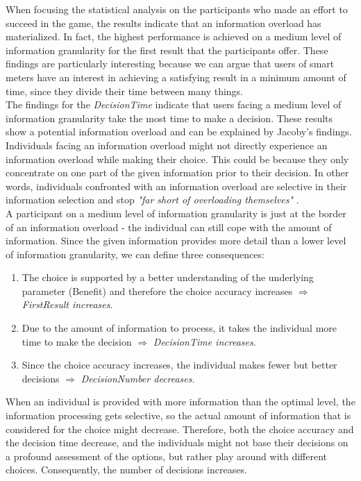 When focusing the statistical analysis on the participants who made an effort to succeed in the game, the results indicate that an information overload has materialized. In fact, the highest performance is achieved on a medium level of information granularity for the first result that the participants offer. These findings are particularly interesting because we can argue that users of smart meters have an interest in achieving a satisfying result in a minimum amount of time, since they divide their time between many things.\\
The findings for the \textit{DecisionTime} indicate that users facing a medium level of information granularity take the most time to make a decision. These results show a potential information overload and can be explained by Jacoby's findings.\\ 
Individuals facing an information overload might not directly experience an information overload while making their choice. This could be because they only concentrate on one part of the given information prior to their decision. In other words, individuals confronted with an information overload are selective in their information selection and stop \textit{"far short of overloading themselves"} \citep{Jacoby1984}.\\
A participant on a medium level of information granularity is just at the border of an information overload - the individual can still cope with the amount of information. Since the given information provides more detail than a lower level of information granularity, we can define three consequences:
\begin{enumerate}
\item The choice is supported by a better understanding of the underlying parameter (Benefit) and therefore the choice accuracy increases $\Rightarrow$ \textit{FirstResult increases}.
\item Due to the amount of information to process, it takes the individual more time to make the decision $\Rightarrow$ \textit{DecisionTime increases}.
\item Since the choice accuracy increases, the individual makes fewer but better decisions $\Rightarrow$ \textit{DecisionNumber decreases}.
\end{enumerate}
When an individual is provided with more information than the optimal level, the information processing gets selective, so the actual amount of information that is considered for the choice might decrease. Therefore, both the choice accuracy and the decision time decrease, and the individuals might not base their decisions on a profound assessment of the options, but rather play around with different choices. Consequently, the number of decisions increases.\\
